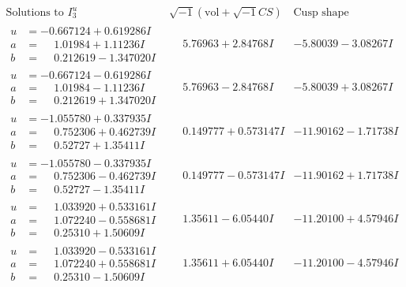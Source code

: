 \documentclass[1p]{elsarticle_modified}
\theoremstyle{definition}
\newcommand{\I}{\sqrt{-1}}
\begin{document}
$$\begin{array}{c|c|c}  
\text{Solutions to }I^u_{3}& \I (\text{vol} + \sqrt{-1}CS) & \text{Cusp shape}\\
 \hline 
\begin{aligned}
u &= -0.667124 + 0.619286 I \\
a &= \phantom{-}1.01984 + 1.11236 I \\
b &= \phantom{-}0.212619 - 1.347020 I\end{aligned}
 & \phantom{-}5.76963 + 2.84768 I & -5.80039 - 3.08267 I \\ \hline\begin{aligned}
u &= -0.667124 - 0.619286 I \\
a &= \phantom{-}1.01984 - 1.11236 I \\
b &= \phantom{-}0.212619 + 1.347020 I\end{aligned}
 & \phantom{-}5.76963 - 2.84768 I & -5.80039 + 3.08267 I \\ \hline\begin{aligned}
u &= -1.055780 + 0.337935 I \\
a &= \phantom{-}0.752306 + 0.462739 I \\
b &= \phantom{-}0.52727 + 1.35411 I\end{aligned}
 & \phantom{-}0.149777 + 0.573147 I & -11.90162 - 1.71738 I \\ \hline\begin{aligned}
u &= -1.055780 - 0.337935 I \\
a &= \phantom{-}0.752306 - 0.462739 I \\
b &= \phantom{-}0.52727 - 1.35411 I\end{aligned}
 & \phantom{-}0.149777 - 0.573147 I & -11.90162 + 1.71738 I \\ \hline\begin{aligned}
u &= \phantom{-}1.033920 + 0.533161 I \\
a &= \phantom{-}1.072240 - 0.558681 I \\
b &= \phantom{-}0.25310 + 1.50609 I\end{aligned}
 & \phantom{-}1.35611 - 6.05440 I & -11.20100 + 4.57946 I \\ \hline\begin{aligned}
u &= \phantom{-}1.033920 - 0.533161 I \\
a &= \phantom{-}1.072240 + 0.558681 I \\
b &= \phantom{-}0.25310 - 1.50609 I\end{aligned}
 & \phantom{-}1.35611 + 6.05440 I & -11.20100 - 4.57946 I \\ \hline\begin{aligned}

\end{aligned}
\end{array}$$
\end{document}
